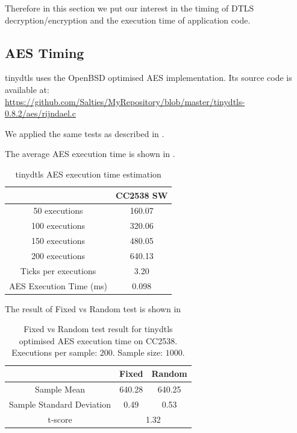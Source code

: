 Therefore in this section we put our interest in the timing of DTLS decryption/encryption and the execution time of application code.

\subsection{AES Timing} \label{tinydtls AES Timing}

tinydtls uses the OpenBSD optimised AES implementation. Its source code is available at:\\ 
\url{https://github.com/Salties/MyRepository/blob/master/tinydtls-0.8.2/aes/rijndael.c}

We applied the same tests as described in . 

The average AES execution time is shown in .

\begin{table}[ht!]
	\center
	\begin{tabular}{|c|c|}
		\hline
		                        & CC2538 SW \\ \hline
		50 executions           & 160.07          \\ \hline
		100 executions          & 320.06          \\ \hline
		150 executions          & 480.05          \\ \hline
		200 executions          & 640.13          \\ \hline
		Ticks per executions    & 3.20            \\ \hline
		AES Execution Time (ms) & 0.098           \\ \hline
	\end{tabular}
	\caption{tinydtls AES execution time estimation}
	\label{Tbl: tinydtls AES execution time estimation}
\end{table}

The result of Fixed vs Random test is shown in 

\begin{table}[ht!]
	\center
	\begin{tabular}{|c|c|c|}
		\hline
		                         & Fixed       & Random      \\ \hline
		Sample Mean              & 640.28      & 640.25      \\ \hline
		Sample Standard Deviation & 0.49        & 0.53        \\ \hline
		t-score                  & \multicolumn{2}{c|}{1.32} \\ \hline
	\end{tabular}
	\caption{Fixed vs Random test result for tinydtls optimised AES execution time on CC2538. Executions per sample: $200$. Sample size: $1000$.}
	\label{Tbl: Fixed vs Random test result for tinydtls AES execution time on CC2538}
\end{table}

